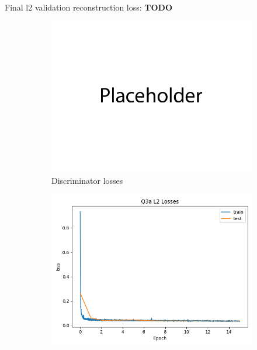 \documentclass{article}
\begin{document}
\newpage
{}\\

Final l2 validation reconstruction loss: \textbf{TODO} \\
\begin{figure}[H]
    \centering
    \begin{subfigure}{0.45\textwidth}
        \centering
        \includegraphics[width=\textwidth]{figures/q3a_gan_losses.png}
        \caption{Discriminator losses}
    \end{subfigure}
    \begin{subfigure}{0.45\textwidth}
        \centering
        \includegraphics[width=\textwidth]{figures/q3a_l2_losses.png}

\end{subfigure}
\end{figure}
\end{document}
